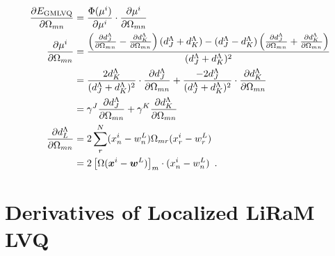 \begin{align}
\frac{\partial E_{\mathrm{GMLVQ}}}{\partial \Omega_{mn}} &= 
\frac{\Phi(\mu^i)}{\partial \mu^i}\cdot\frac{\partial \mu^i}{\partial \Omega_{mn}} \\
% 
\notag\frac{\partial \mu^i}{\partial \Omega_{mn}} &= \frac{\left(\frac{\partial d^\Lambda_J}{\partial\Omega_{mn}}-
\frac{\partial d^\Lambda_K}{\partial\Omega_{mn}}\right)(d^\Lambda_J+d^\Lambda_K)-(d^\Lambda_J-d^\Lambda_K)
\left(\frac{\partial d^\Lambda_J}{\partial\Omega_{mn}}+
\frac{\partial d^\Lambda_K}{\partial\Omega_{mn}}\right)}{(d^\Lambda_J+d^\Lambda_K)^2} \\
%
\notag&= \frac{2d^\Lambda_K}{(d^\Lambda_J+d^\Lambda_K)^2}\cdot\frac{\partial d^\Lambda_J}{\partial\Omega_{mn}} +  
  \frac{-2d^\Lambda_J}{(d^\Lambda_J+d^\Lambda_K)^2}\cdot\frac{\partial d^\Lambda_K}{\partial\Omega_{mn}} \\
% 
&= \gamma^J\frac{\partial d^\Lambda_J}{\partial\Omega_{mn}} + \gamma^K\frac{\partial d^\Lambda_K}{\partial\Omega_{mn}} \\
% 
\notag \frac{\partial d_L^{\Lambda}}{\partial \Omega_{mn}} &= 2\sum_r^N(x^i_n-w^L_{n})\Omega_{mr}(x^i_r-w^L_{r}) \\
&= 2 \left[\Omega(\v{x}^i-\v{w}^L)\right]_m \cdot(x^i_n-w^L_{n}) \enspace .
\end{align}

\section{Derivatives of Localized LiRaM LVQ}\label{app:LLiRaM_LVQ_derivatives}

